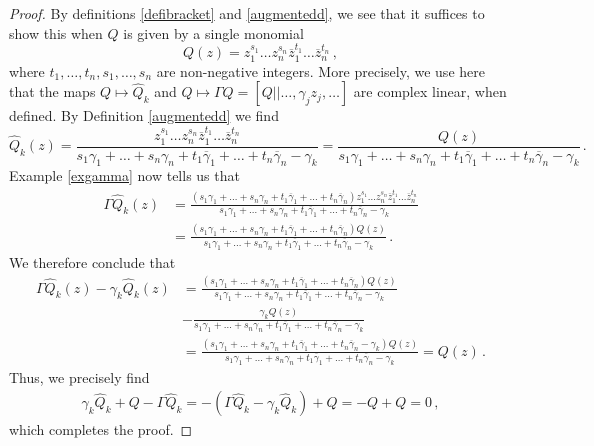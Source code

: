\documentclass[12pt]{article}
\theoremstyle{plain}
\theoremstyle{definition}
\theoremstyle{remark}
\theoremstyle{remark}
\begin{document}
\begin{proof}
By definitions \ref{defibracket} and \ref{augmentedd}, we see that it suffices to show this when $Q$ is given by a single monomial 
\[ Q(z) =  z_1^{s_1}\dots  z_n^{s_n} \overline{z}_1^{t_1}  \dots  \overline{z}_n^{t_n}\, ,\] 
where $t_1, \dots, t_n, s_1, \dots, s_n$ are non-negative integers. More precisely, we use here that the maps $Q \mapsto \widehat{Q}_k$ and $Q \mapsto \Gamma Q = [Q||\dots ,\gamma_jz_j, \dots]$ are complex linear, when defined. By Definition  \ref{augmentedd} we find 
\[\widehat{Q}_k(z) = \frac{z_1^{s_1}\dots  z_n^{s_n} \overline{z}_1^{t_1}  \dots  \overline{z}_n^{t_n}}{s_1\gamma_1 +\dots + s_n\gamma_n + t_1\overline{\gamma}_1 + \dots + t_n\overline{\gamma}_n - \gamma_k} = \frac{Q(z)}{s_1\gamma_1 +\dots + s_n\gamma_n + t_1\overline{\gamma}_1 + \dots + t_n\overline{\gamma}_n - \gamma_k}\, .\]
Example \ref{exgamma} now tells us that 
\begin{align}
\Gamma\widehat{Q}_k(z) &= \frac{(s_1\gamma_1 +\dots + s_n\gamma_n + t_1\overline{\gamma}_1 + \dots + t_n\overline{\gamma}_n)z_1^{s_1}\dots  z_n^{s_n} \overline{z}_1^{t_1}  \dots  \overline{z}_n^{t_n}}{s_1\gamma_1 +\dots + s_n\gamma_n + t_1\overline{\gamma}_1 + \dots + t_n\overline{\gamma}_n - \gamma_k} \\ \nonumber
&= \frac{(s_1\gamma_1 +\dots + s_n\gamma_n + t_1\overline{\gamma}_1 + \dots + t_n\overline{\gamma}_n)Q(z)}{s_1\gamma_1 +\dots + s_n\gamma_n + t_1\overline{\gamma}_1 + \dots + t_n\overline{\gamma}_n - \gamma_k}\, .
\end{align}
We therefore conclude that
\begin{align}
\Gamma\widehat{Q}_k(z) - \gamma_k\widehat{Q}_k(z)&= \frac{(s_1\gamma_1 +\dots + s_n\gamma_n + t_1\overline{\gamma}_1 + \dots + t_n\overline{\gamma}_n)Q(z)}{s_1\gamma_1 +\dots + s_n\gamma_n + t_1\overline{\gamma}_1 + \dots + t_n\overline{\gamma}_n - \gamma_k} \\ \nonumber
&- \frac{\gamma_kQ(z)}{s_1\gamma_1 +\dots + s_n\gamma_n + t_1\overline{\gamma}_1 + \dots + t_n\overline{\gamma}_n - \gamma_k} \\ \nonumber
&=  \frac{(s_1\gamma_1 + \dots + s_n\gamma_n + t_1\overline{\gamma}_1 + \dots + t_n\overline{\gamma}_n - \gamma_k)Q(z)}{s_1\gamma_1 +\dots + s_n\gamma_n + t_1\overline{\gamma}_1 + \dots + t_n\overline{\gamma}_n - \gamma_k}  = Q(z) \, .
\end{align}
Thus, we precisely find 
\begin{align} 
\gamma_k\widehat{Q}_k + Q - \Gamma \widehat{Q}_k = - (\Gamma \widehat{Q}_k - \gamma_k\widehat{Q}_k) + Q = -Q + Q = 0\, ,
\end{align}
which completes the proof.
\end{proof}
\end{document}
